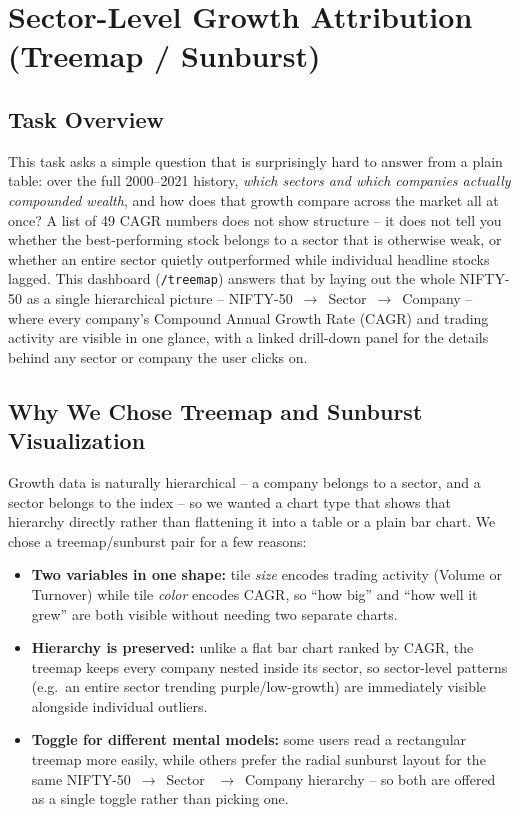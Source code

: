 \documentclass[14pt,a4paper]{extreport}
\begin{document}
\section{Sector-Level Growth Attribution (Treemap / Sunburst)}

\subsection{Task Overview}
This task asks a simple question that is surprisingly hard to answer from
a plain table: over the full 2000--2021 history, \emph{which sectors and
which companies actually compounded wealth}, and how does that growth
compare across the market all at once? A list of 49 CAGR numbers does not
show structure -- it does not tell you whether the best-performing stock
belongs to a sector that is otherwise weak, or whether an entire sector
quietly outperformed while individual headline stocks lagged. This
dashboard (\texttt{/treemap}) answers that by laying out the whole
NIFTY-50 as a single hierarchical picture --
NIFTY-50~$\rightarrow$~Sector~$\rightarrow$~Company -- where every
company's Compound Annual Growth Rate (CAGR) and trading activity are
visible in one glance, with a linked drill-down panel for the details
behind any sector or company the user clicks on.

\subsection{Why We Chose Treemap and Sunburst Visualization}
Growth data is naturally hierarchical -- a company belongs to a sector,
and a sector belongs to the index -- so we wanted a chart type that shows
that hierarchy directly rather than flattening it into a table or a
plain bar chart. We chose a treemap/sunburst pair for a few reasons:

\begin{itemize}
    \item \textbf{Two variables in one shape:} tile \emph{size} encodes
        trading activity (Volume or Turnover) while tile \emph{color}
        encodes CAGR, so ``how big'' and ``how well it grew'' are both
        visible without needing two separate charts.
    \item \textbf{Hierarchy is preserved:} unlike a flat bar chart ranked
        by CAGR, the treemap keeps every company nested inside its sector,
        so sector-level patterns (e.g.\ an entire sector trending
        purple/low-growth) are immediately visible alongside individual
        outliers.
    \item \textbf{Toggle for different mental models:} some users read a
        rectangular treemap more easily, while others prefer the radial
        sunburst layout for the same NIFTY-50~$\rightarrow$~Sector~
        $\rightarrow$~Company hierarchy -- so both are offered as a single
        toggle rather than picking one.
\end{itemize}
\end{document}
